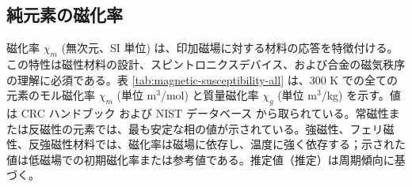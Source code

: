 \documentclass[11pt,a4paper]{article}
\theoremstyle{remark}
\begin{document}
	\subsection{純元素の磁化率}
	\label{subsec:magnetic-susceptibility}
	
	磁化率 \(\chi_m\) (無次元、SI 単位) は、印加磁場に対する材料の応答を特徴付ける。この特性は磁性材料の設計、スピントロニクスデバイス、および合金の磁気秩序の理解に必須である。表 \ref{tab:magnetic-susceptibility-all} は、300 K での全ての元素のモル磁化率 \(\chi_m\) (単位 m\(^3\)/mol) と質量磁化率 \(\chi_g\) (単位 m\(^3\)/kg) を示す。値は CRC ハンドブック \cite{CRC} および NIST データベース \cite{NIST} から取られている。常磁性または反磁性の元素では、最も安定な相の値が示されている。強磁性、フェリ磁性、反強磁性材料では、磁化率は磁場に依存し、温度に強く依存する；示された値は低磁場での初期磁化率または参考値である。推定値（推定）は周期傾向に基づく。
	
\end{document}
